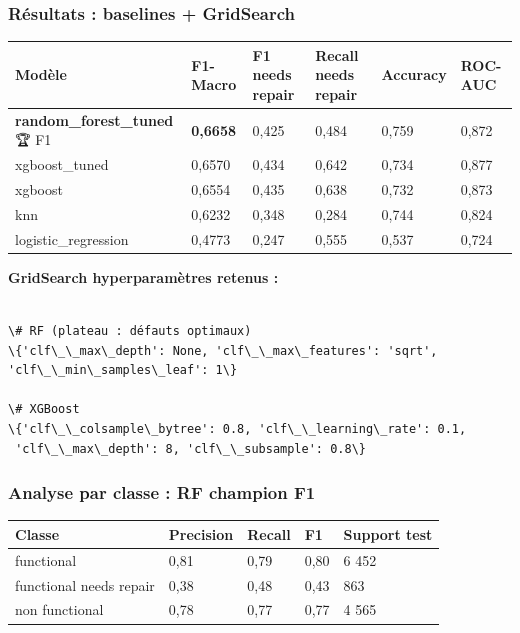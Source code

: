 \documentclass[11pt,a4paper]{report}
\begin{document}
\subsubsection{Résultats : baselines + GridSearch}



\begin{longtable}{@{}llllll@{}}
\toprule
Modèle & F1-Macro & F1 needs repair & Recall needs repair & Accuracy & ROC-AUC \\
\midrule
\textbf{random\_forest\_tuned} 🏆 F1 & \textbf{0,6658} & 0,425 & 0,484 & 0,759 & 0,872 \\
xgboost\_tuned & 0,6570 & 0,434 & 0,642 & 0,734 & 0,877 \\
xgboost & 0,6554 & 0,435 & 0,638 & 0,732 & 0,873 \\
knn & 0,6232 & 0,348 & 0,284 & 0,744 & 0,824 \\
logistic\_regression & 0,4773 & 0,247 & 0,555 & 0,537 & 0,724 \\
\bottomrule
\end{longtable}




\textbf{GridSearch hyperparamètres retenus :}



\begin{lstlisting}

\# RF (plateau : défauts optimaux)
\{'clf\_\_max\_depth': None, 'clf\_\_max\_features': 'sqrt', 'clf\_\_min\_samples\_leaf': 1\}

\# XGBoost
\{'clf\_\_colsample\_bytree': 0.8, 'clf\_\_learning\_rate': 0.1,
 'clf\_\_max\_depth': 8, 'clf\_\_subsample': 0.8\}

\end{lstlisting}



\subsubsection{Analyse par classe : RF champion F1}



\begin{longtable}{@{}lllll@{}}
\toprule
Classe & Precision & Recall & F1 & Support test \\
\midrule
functional & 0,81 & 0,79 & 0,80 & 6 452 \\
functional needs repair & 0,38 & 0,48 & 0,43 & 863 \\
non functional & 0,78 & 0,77 & 0,77 & 4 565 \\
\bottomrule
\end{longtable}
\end{document}
